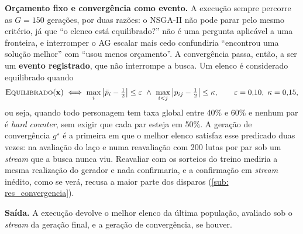 \textbf{Orçamento fixo e convergência como evento.} A execução sempre percorre as $G = 150$ gerações, por duas razões: o NSGA-II não pode parar pelo mesmo critério, já que ``o elenco está equilibrado?'' não é uma pergunta aplicável a uma fronteira, e interromper o AG escalar mais cedo confundiria ``encontrou uma solução melhor'' com ``usou menos orçamento''. A convergência passa, então, a ser um \textbf{evento registrado}, que não interrompe a busca. Um elenco é considerado equilibrado quando
\begin{equation}
    \label{eq: equilibrado}
    \textsc{Equilibrado}(\mathbf{x}) \iff
    \max_{i} \left| \bar{p}_i - \tfrac{1}{2} \right| \le \varepsilon
    \ \wedge\
    \max_{i<j} \left| p_{ij} - \tfrac{1}{2} \right| \le \kappa,
    \qquad \varepsilon = 0{,}10,\ \kappa = 0{,}15,
\end{equation}
ou seja, quando todo personagem tem taxa global entre 40\% e 60\% e nenhum par é \textit{hard counter}, sem exigir que cada par esteja em 50\%. A geração de convergência $g^\star$ é a primeira em que o melhor elenco satisfaz esse predicado duas vezes: na avaliação do laço e numa reavaliação com 200 lutas por par sob um \textit{stream} que a busca nunca viu. Reavaliar com os sorteios do treino mediria a mesma realização do gerador e nada confirmaria, e a confirmação em \textit{stream} inédito, como se verá, recusa a maior parte dos disparos (\autoref{sub: res_convergencia}).

\textbf{Saída.} A execução devolve o melhor elenco da última população, avaliado sob o \textit{stream} da geração final, e a geração de convergência, se houver.

